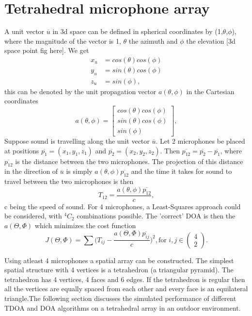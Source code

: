 \section{Tetrahedral microphone array}
A unit vector $\overline{u}$ in 3d space can be defined in spherical coordinates by (1,$\theta$,$\phi$), where the magnitude of the vector is 1, $\theta$ the azimuth and $\phi$ the elevation [3d space point fig here]. We get
\begin{equation}
    \begin{split}
        x_u&=cos(\theta)cos(\phi) \\
        y_u&=sin(\theta)cos(\phi) \\
        z_u&=sin(\phi),
    \end{split}
\end{equation}
this can be denoted by the unit propagation vector ${a(\theta,\phi)}$ in the Cartesian coordinates
\begin{equation}
    a(\theta,\phi)=\begin{bmatrix}cos(\theta)cos(\phi) \\sin(\theta)cos(\phi) \\sin(\phi)\end{bmatrix},
\end{equation}
Suppose sound is travelling along the unit vector $\overline{u}$. Let 2 microphones be placed at positions $\overline{p_1}=(x_1,y_1,z_1)$ and $\overline{p_2}=(x_2,y_2,z_2)$.  Then $\overline{p_{12}}=\overline{p_{2}}-\overline{p_{1}}$, where ${\overline{p_{12}}}$ is the distance between the two microphones. The projection of this distance in the direction of $\overline{u}$ is simply $a(\theta,\phi)\overline{p_{12}}$ and the time it takes for sound to travel between the two microphones is then 
\begin{equation}
    T_{12}=\frac{a(\theta,\phi)\overline{p_{12}}}{c},
\end{equation} c being the speed of sound. For 4 microphones, a Least-Squares approach could be considered, with $^4C_2$ combinations possible. The 'correct' DOA is then the $a(\Theta,\Phi)$ which minimizes the cost function
\begin{equation}
    J(\Theta,\Phi) = \sum\bigg(T_{ij}-\frac{a(\Theta,\Phi)\overline{p_{ij}}}{c}\bigg)^2, \text{for } i,j \in \begin{pmatrix}4\\2\end{pmatrix}.
\end{equation}

Using atleast 4 microphones a spatial array can be constructed. The simplest spatial structure with 4 vertices is a tetrahedron (a triangular pyramid). The tetrahedron has 4 vertices, 4 faces and 6 edges. If the tetrahedron is regular then all the vertices are equally spaced from each other and every face is an equilateral triangle.The following section discusses the simulated performance of different TDOA and DOA algorithms on a tetrahedral array in an outdoor environment.

